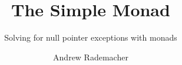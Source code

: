 \documentclass{beamer}
\begin{document}
    \title{The Simple Monad}
    \subtitle{Solving for null pointer exceptions with monads}
    \author{Andrew Rademacher}

    \frame{\titlepage}
\end{document}
